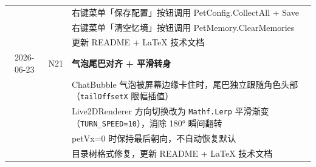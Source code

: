 \documentclass[12pt,a4paper]{ctexart}
\begin{document}
\begin{table}[H]
\begin{tabular}{cl>{\raggedright\arraybackslash}p{}}
           &       & 右键菜单「保存配置」按钮调用 PetConfig.CollectAll + Save\\
           &       & 右键菜单「清空忆境」按钮调用 PetMemory.ClearMemories\\
           &       & 更新 README + LaTeX 技术文档\\
2026-06-23 & N21  & \textbf{气泡尾巴对齐 + 平滑转身}\\
           &       & ChatBubble 气泡被屏幕边缘卡住时，尾巴独立跟随角色头部（\texttt{tailOffsetX} 限幅插值）\\
           &       & Live2DRenderer 方向切换改为 \texttt{Mathf.Lerp} 平滑渐变（\texttt{TURN\_SPEED=10}），消除 180° 瞬间翻转\\
           &       & petVx=0 时保持最后朝向，不自动恢复默认\\
           &       & 目录树格式修复，更新 README + LaTeX 技术文档\\
\bottomrule
\end{tabular}
\end{table}
\end{document}
